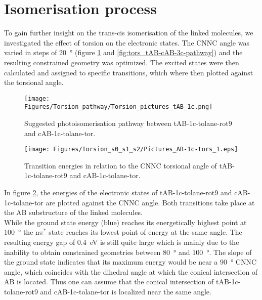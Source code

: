 \section{Isomerisation process}
To gain further insight on the trans-cis isomerisation of the linked molecules, we investigated the effect of torsion on the electronic states. The CNNC angle was varied in steps of \SI{20}{\degree} (figure \ref{fig:tors_tAB-cAB-1c-pathway} and \ref{fig:tors_tAB-cAB-3c-pathway}) and the resulting constrained geometry was optimized. The excited states were then calculated and assigned to specific transitions, which where then plotted against the torsional angle. 
%
%
%
%
\begin{figure}[H]
    \centering
    \texttt{[image: Figures/Torsion\_pathway/Torsion\_pictures\_tAB\_1c.png]}
    \caption{Suggested photoisomerisation pathway between tAB-1c-tolane-rot9 and cAB-1c-tolane-tor.}
    \label{fig:tors_tAB-cAB-1c-pathway}
\end{figure}
%
%
\begin{figure}[H]
    \centering
    \texttt{[image: Figures/Torsion\_s0\_s1\_s2/Pictures\_AB-1c-tors\_1.eps]}
    \caption{Transition energies in relation to the CNNC torsional angle of tAB-1c-tolane-rot9 and cAB-1c-tolane-tor.}
    \label{fig:tors_tAB-cAB-1c}
\end{figure}
%
In figure \ref{fig:tors_tAB-cAB-1c}, the energies of the electronic states of tAB-1c-tolane-rot9 and cAB-1c-tolane-tor are plotted against the CNNC angle. Both transitions take place at the AB substructure of the linked molecules. \\
While the ground state energy (blue) reaches its energetically highest point at \SI{100}{\degree} the n$\pi^{*}$ state reaches its lowest point of energy at the same angle. The resulting energy gap of \SI{0.4}{\eV} is still quite large which is mainly due to the inability to obtain constrained geometries between \SI{80}{\degree} and \SI{100}{\degree}. The slope of the ground state indicates that its maximum energy would be near a \SI{90}{\degree} CNNC angle, which coincides with the dihedral angle at which the conical intersection of AB is located.\cite{maximum-con-inter-AB} Thus one can assume that the conical intersection of tAB-1c-tolane-rot9 and cAB-1c-tolane-tor is localized near the same angle. 
%
